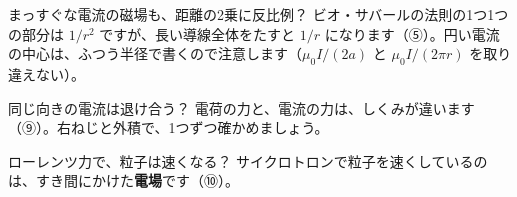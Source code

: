 \begin{tsumazuki}{まっすぐな電流の磁場も、距離の2乗に反比例？}
ビオ・サバールの法則の1つ1つの部分は $1/r^2$ ですが、長い導線全体をたすと $1/r$ になります（⑤）。円い電流の中心は、ふつう半径で書くので注意します（$\mu_0I/(2a)$ と $\mu_0I/(2\pi r)$ を取り違えない）。
\end{tsumazuki}

\begin{tsumazuki}{同じ向きの電流は退け合う？}
電荷の力と、電流の力は、しくみが違います（⑨）。右ねじと外積で、1つずつ確かめましょう。
\end{tsumazuki}

\begin{tsumazuki}{ローレンツ力で、粒子は速くなる？}
サイクロトロンで粒子を速くしているのは、すき間にかけた\textbf{電場}です（⑩）。
\end{tsumazuki}

